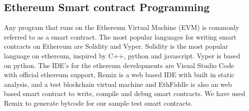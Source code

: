 \documentclass{article}
\begin{document}
\subsection*{Ethereum Smart contract Programming}
Any program that runs on the Ethereum Virtual Machine (EVM) is commonly referred to as a smart contract. The most popular languages for writing smart contracts on Ethereum are Solidity and Vyper. Solidity is the most popular language on ethereum, inspired by C++, python and javascript. Vyper is based on python. The IDE's for the ethereum developments are Visual Studio Code with official ethereum support, Remix is a web based IDE with built in static analysis, and a test blockchain virtual machine and EthFiddle is also an web based smart contract to write, compile and debug smart contracts. We have used Remix to generate bytcode for our sample test smart contracts.
\end{document}
